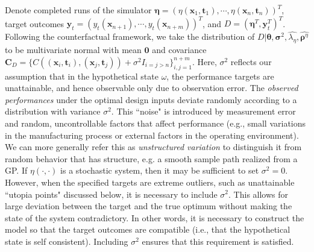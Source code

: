 \documentclass[twocolumn,10pt]{asme2ej}
\begin{document}
%
Denote completed runs of the simulator $\boldsymbol \eta = (\eta(\mathbf x_1,\mathbf t_1),\cdots,\eta(\mathbf x_n,\mathbf t_n))^T$, target outcomes $\mathbf y_t = (y_t(\mathbf x_{n+1}),\cdots,y_t(\mathbf x_{n+m}))^T$, 
and $D = (\boldsymbol \eta^T,\mathbf y_t^T)^T$.
%
Following the counterfactual framework, we take the distribution of $D | \boldsymbol \theta,\boldsymbol\sigma^2,\widehat{\lambda_\eta}, \widehat{\boldsymbol \rho^\eta}$ to be multivariate normal with mean $\boldsymbol 0$ and covariance $\mathbf C_D = \{C((\mathbf x_i,\mathbf t_i),(\mathbf x_j,\mathbf t_j)) + 
\sigma^2 I_{i=j>n}\}_{i,j=1}^{n+m}$.
%
%
Here, $\sigma^2$ reflects our assumption that in the hypothetical state $\omega$, the performance targets are unattainable, and hence observable only due to observation error. The {\em observed performances} under the optimal design inputs deviate randomly according to a distribution with variance $\sigma^2$. This ``noise" is introduced by measurement error and random, uncontrollable factors that affect performance (e.g., small variations in the manufacturing process or external factors in the operating environment). We can more generally refer this as {\em unstructured variation} to distinguish it from random behavior that has structure, e.g. a smooth sample path realized from a GP.
%
If $\eta(\cdot, \cdot)$ is a stochastic system, then it may be sufficient to set $\sigma^2 = 0$.
%
However, when the specified targets are extreme outliers, such as unattainable ``utopia points" discussed below, it is necessary to include $\sigma^2$. This allows for large deviation between the target and the true optimum without making the state of the system contradictory.
%
%
In other words, it is necessary to construct the model so that the target outcomes are compatible (i.e., that the hypothetical state is self consistent). Including $\sigma^2$ ensures that this requirement is satisfied.
%
%
\end{document}
